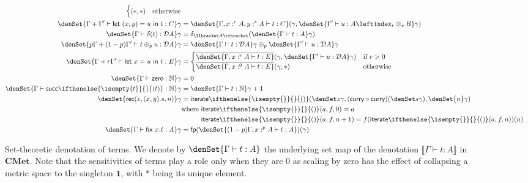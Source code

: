 \documentclass[a4paper,UKenglish,cleveref, autoref, thm-restate]{lipics-v2021}
\providecommand*{\ifempty}[3]{\ifthenelse{\isempty{#1}}{#2}{#3}}
\newcommand{\parensmathoper}[2]{\ensuremath{#1\ifempty{#2}{}{(#2)}}}
\newcommand{\cat}[1]{\mathbf{#1}}
\newcommand{\CMet}{\cat{CMet}}
\newcommand{\unit}{\mathbf{1}}
\newcommand{\nat}{\mathbb{N}}
\newcommand{\pair}[2]{\otimes_{#1,#2}}
\renewcommand{\pair}[2]{\leftindex_{#1}\otimes_{#2}} %
\newcommand{\semfp}{\mathsf{fp}}
\newcommand{\iterate}[1][n]{\parensmathoper{\mathsf{iterate}}{#1}}
\newcommand{\ts}{\vdash}
\newcommand{\hastype}[3]{#1\ts #2 : #3}
\newcommand{\letIn}[2]{\mathsf{let~} #1 \mathsf{~in~} #2}
\newcommand{\fix}[2]{\mathsf{fix~} #1 . #2 }
\newcommand{\Zero}{\mathsf{zero}}
\newcommand{\Succ}{\parensmathoper{\mathsf{succ}}}
\newcommand{\Rec}[3]{\mathsf{rec}(#1,#2,#3)}
\newcommand{\curry}{\mathsf{curry}}
\newcommand{\TD}{\mathcal{D}}
\newcommand{\den}[1]{\llbracket #1\rrbracket}
\begin{document}
\begin{figure}[tb]
\begin{align*}
\begin{cases}
    (*,*) &\text{otherwise}
    \end{cases}
    \\
\denSet{\hastype{\Gamma+\Gamma'}{\letIn{(x,y)=u}{t}}{C}}\gamma 
    &= \denSet{\hastype{\Gamma,x:^rA,y:^sA}{t}{C}}(\gamma, 
        \denSet{\hastype{\Gamma'}{u}{A \pair rs B}}\gamma ) \\
\denSet{\hastype{\Gamma}{\delta(t)}{\TD A}}\gamma 
    &= \delta_{\den{A}}(\denSet{\hastype{\Gamma}{t}{A}}\gamma) \\
\denSet{\hastype{p\Gamma+(1-p)\Gamma'}{t\oplus_p u}{\TD A}}\gamma 
    &= \denSet{\hastype{\Gamma}{t}{\TD A}}\gamma 
    \oplus_p \denSet{\hastype{\Gamma'}{u}{\TD A}}\gamma \\
\denSet{\hastype{\Gamma+r\Gamma'}{\letIn{x=u}{t}}{E}}\gamma 
    &= 
    \begin{cases}
    \overline{\denSet{\hastype{\Gamma,x:^rA}{t}{E}}}(\gamma, 
        \denSet{\hastype{\Gamma'}{u}{\TD A}}\gamma) &\text{if $r>0$}\\
    \overline{\denSet{\hastype{\Gamma,x:^0A}{t}{E}}}(\gamma, *) &\text{otherwise}
    \end{cases}\\
\denSet{\hastype{\Gamma}{\Zero}{\nat}}\gamma &= 0 \\
\denSet{\hastype{\Gamma}{\Succ{t}}{\nat}}\gamma 
    &= \denSet{\hastype{\Gamma}{t}{\nat}}\gamma +1 \\
\denSet{\Rec{z}{(x,y).s}{n}}\gamma 
    &= 
    \iterate[](\denSet z\gamma,
               (\curry \circ \curry)(\denSet s\gamma),
               \denSet{n}\gamma ) \\
    &\text{where } \iterate[](a,f,0) = a \\
    &\phantom{\text{where }} \iterate[](a,f,n+1) = f(\iterate[](a,f,n))(n) \\
\denSet{\hastype{\Gamma}{\fix{x}{t}}{A}}\gamma &= \semfp(\denSet{\hastype{(1-p)\Gamma,x:^pA}{t}{A}})(\gamma)
\end{align*}

\caption{Set-theoretic denotation of terms. We denote by $\denSet{\hastype{\Gamma}{t}{A}}$ the underlying set map of the denotation
$\den{\hastype{\Gamma}{t}{A}}$ in $\CMet$. Note that the sensitivities of terms play a role only when they are $0$ as scaling by zero has the effect of collapsing a metric space to the singleton $\unit$, with $*$ being its unique element.}
\label{fig:setmap-semantics}
\end{figure}
\end{document}
